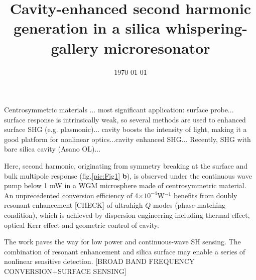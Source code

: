 \documentclass[a4paper,8pt,hyperref, twocolumn]{article}
\title{\bfseries \Large Cavity-enhanced second harmonic generation in a silica whispering-gallery microresonator}
\date{\normalsize \today}
\begin{document}
\maketitle



Centrosymmetric materials ... most significant application: surface probe... surface response is intrinsically weak, so several methods are used to enhanced surface SHG (e.g. plasmonic)... cavity boosts the intensity of light, making it a good platform for nonlinear optics...cavity enhanced SHG... Recently, SHG with bare silica cavity (Asano OL)...

Here, second harmonic, originating from symmetry breaking at the surface and bulk multipole response (fig.\ref{pic:Fig1} \textbf{b}), is observed under the continuous wave pump below 1 mW in a WGM microsphere made of centrosymmetric material. 
An unprecedented conversion efficiency of 4$\times10^{-4}$W$^{-1}$ benefits from doubly resonant enhancement [CHECK] of ultrahigh $Q$ modes (phase-matching condition), which is achieved by dispersion engineering including thermal effect, optical Kerr effect and geometric control of cavity. 

The work paves the way for low power and continuous-wave SH sensing. The combination of resonant enhancement and silica surface may enable a series of nonlinear sensitive detection. [BROAD BAND FREQUENCY CONVERSION+SURFACE SENSING]
\end{document}
